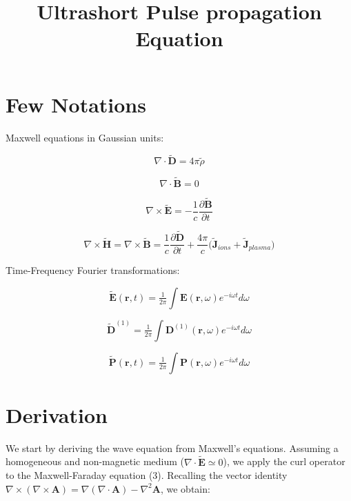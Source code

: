 \documentclass[11pt,a4paper]{article}
\title{Ultrashort Pulse propagation Equation}
\author{}
\date{}
\begin{document}
\maketitle


\section{Few Notations}
Maxwell equations in Gaussian units:

\begin{equation}
\nabla \cdot \tilde{\mathbf{D}} = 4\pi \tilde{\rho}
\end{equation}

\begin{equation}
\nabla \cdot \tilde{\mathbf{B}} = 0
\end{equation}

\begin{equation}
\nabla \times \tilde{\mathbf{E}} = -\frac{1}{c} \frac{\partial \tilde{\mathbf{B}}}{\partial t}
\end{equation}

\begin{equation}
\nabla \times \tilde{\mathbf{H}}= \nabla \times \tilde{\mathbf{B}} = \frac{1}{c} \frac{\partial \tilde{\mathbf{D}}}{\partial t} + \frac{4\pi}{c} \big(\tilde{\mathbf{J}}_{ions}+\tilde{\mathbf{J}}_{plasma}\big)
\end{equation}

Time-Frequency Fourier transformations:

\begin{equation}
\tilde{\mathbf{E}}(\mathbf{r},t)=\tfrac{1}{2\pi}\int {\mathbf{E}}(\mathbf{r},\omega)e^{-i\omega t}d\omega
\end{equation}

\begin{equation}
\tilde{\mathbf{D}}^{(1)}=\tfrac{1}{2\pi}\int {\mathbf{D}}^{(1)}(\mathbf{r},\omega)e^{-i\omega t}d\omega
\end{equation}

\begin{equation}
\tilde{\mathbf{P}}(\mathbf{r},t)=\tfrac{1}{2\pi}\int {\mathbf{P}}(\mathbf{r},\omega)e^{-i\omega t}d\omega
\end{equation}

\section{Derivation}
\noindent We start by deriving the wave equation from Maxwell's equations. Assuming a homogeneous and non-magnetic medium ($\nabla \cdot \tilde{\mathbf{E}} \simeq 0$), we apply the curl operator to the Maxwell-Faraday equation (3). Recalling the vector identity $\nabla \times (\nabla \times \mathbf{A}) = \nabla(\nabla \cdot \mathbf{A}) - \nabla^2 \mathbf{A}$, we obtain:
\end{document}
